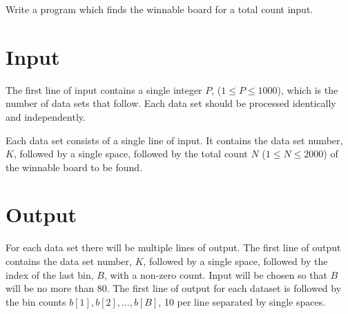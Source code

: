 Write a program which finds the winnable board for a total count input.

\section*{Input}

The first line of input contains a single integer $P$, ($1 \le P \le 1000$),
which is the number of data sets that follow.  Each data set should be
processed identically and independently.

Each data set consists of a single line of input.  It contains the data
set number, $K$, followed by a single space, followed by the total count $N$
($1 \le N \le 2000$) of the winnable board to be found.

\section*{Output}

For each data set there will be multiple lines of output.  The first
line of output contains the data set number, $K$, followed by a single
space, followed by the index of the last bin, $B$, with a non-zero count.
Input will be chosen so that $B$ will be no more than $80$.  The first line
of output for each dataset is followed by the bin counts $b[1], b[2], … , b[B]$,
10 per line separated by single spaces.

